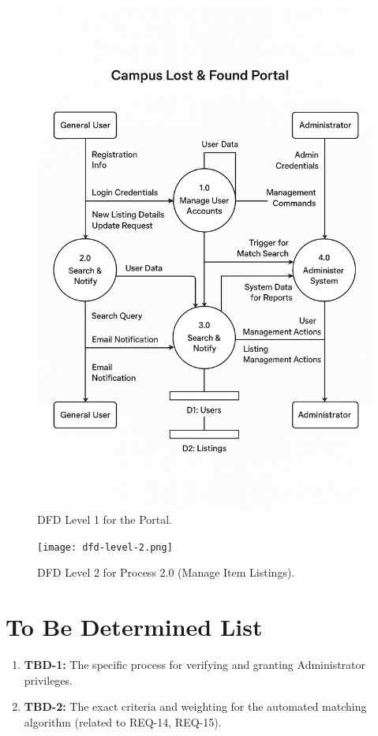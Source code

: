 \documentclass[11pt, a4paper]{article}
\begin{document}
\begin{figure}[h!]
    \centering
    \includegraphics[width=\textwidth]{dfd-level-1.png}
    \caption{DFD Level 1 for the Portal.}
    \label{fig:dfd1}
\end{figure}
\newpage

\begin{figure}[h!]
    \centering
    \texttt{[image: dfd-level-2.png]}
    \caption{DFD Level 2 for Process 2.0 (Manage Item Listings).}
    \label{fig:dfd2}
\end{figure}


\section{To Be Determined List}
\begin{enumerate}
    \item \textbf{TBD-1:} The specific process for verifying and granting Administrator privileges.
    \item \textbf{TBD-2:} The exact criteria and weighting for the automated matching algorithm (related to REQ-14, REQ-15).
\end{enumerate}

\end{document}
